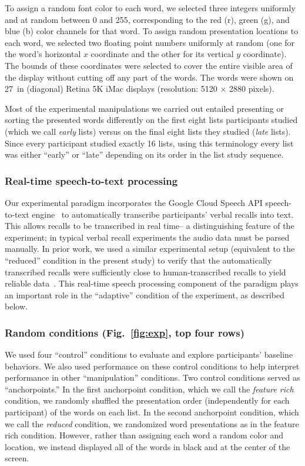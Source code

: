 \documentclass[11pt]{article}
\begin{document}
To assign a random font color to each word, we selected three integers
uniformly and at random between 0 and 255, corresponding to the red (r), green
(g), and blue (b) color channels for that word. To assign random presentation
locations to each word, we selected two floating point numbers uniformly at
random (one for the word's horizontal $x$ coordinate and the other for its
vertical $y$ coordinate).  The bounds of these coordinates were selected to cover the entire
visible area of the display without cutting off any part of the words.  The words were shown
on 27~in (diagonal) Retina 5K iMac displays (resolution: 5120 $\times$ 2880 pixels).

Most of the experimental manipulations we carried out entailed presenting or
sorting the presented words differently on the first eight lists participants
studied (which we call \textit{early} lists) versus on the final eight lists
they studied (\textit{late} lists). Since every participant studied exactly 16
lists, using this terminology every list was either ``early'' or ``late''
depending on its order in the list study sequence.


\subsubsection*{Real-time speech-to-text processing}

Our experimental paradigm incorporates the Google Cloud Speech API
speech-to-text engine~\citep{HalpEtal16} to automatically transcribe
participants' verbal recalls into text. This allows recalls to be transcribed
in real time-- a distinguishing feature of the experiment; in typical verbal
recall experiments the audio data must be parsed manually. In prior work, we
used a similar experimental setup (equivalent to the ``reduced'' condition in
the present study) to verify that the automatically transcribed recalls were
sufficiently close to human-transcribed recalls to yield reliable
data~\citep{ZimaEtal18}. This real-time speech processing component of the
paradigm plays an important role in the ``adaptive'' condition of the
experiment, as described below.

\subsubsection*{Random conditions (Fig.~\ref{fig:exp}, top four rows)}

We used four ``control'' conditions to evaluate and explore participants'
baseline behaviors. We also used performance on these control conditions to
help interpret performance in other ``manipulation'' conditions. Two control
conditions served as ``anchorpoints.'' In the first anchorpoint condition,
which we call the \textit{feature rich} condition, we randomly shuffled the
presentation order (independently for each participant) of the words on each
list. In the second anchorpoint condition, which we call the \textit{reduced}
condition, we randomized word presentations as in the feature rich condition.
However, rather than assigning each word a random color and location, we
instead displayed all of the words in black and at the center of the screen.
\end{document}
